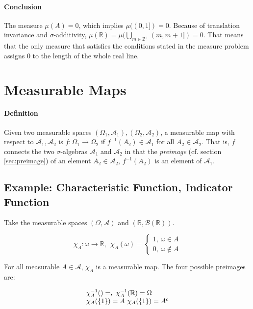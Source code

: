 \paragraph{Conclusion}
The measure $\mu(A) = 0$, which implies $\mu((0,1]) = 0$. Because of translation invariance and $\sigma$-additivity, $\mu(\mathbb{R}) = \mu(\bigcup_{m\in\mathbb{Z}^+} (m,m+1]) = 0$. That means that the only measure that satisfies the conditions stated in the measure problem assigns $0$ to the length of the whole real line. 


  
\section{Measurable Maps}
\paragraph{Definition} Given two measurable spaces $(\Omega_1,\mathscr{A}_1), (\Omega_2, \mathscr{A}_2)$, a measurable map with respect to $\mathscr{A}_1, \mathscr{A}_2$ is $f:\Omega_1 \rightarrow \Omega_2$ if $f^{-1}(A_2)\in\mathscr{A}_1$ for all $A_2 \in \mathscr{A}_2$. That is, $f$ connects the two $\sigma$-algebras $\mathscr{A}_1$ and $\mathscr{A}_2$ in that the \textit{preimage} (cf. section \ref{sec:preimage}) of an element $A_2 \in \mathscr{A}_2$, $f^{-1}(A_2)$ is an element of $\mathscr{A}_1$. 




\subsection{Example: Characteristic Function, Indicator Function}
Take the measurable spaces $(\Omega,\mathscr{A})$ and $(\mathbb{R},\mathscr{B}(\mathbb{R}))$. 

\begin{equation}
\chi_A: \omega \rightarrow \mathbb{R},\ \ \chi_A(\omega) = \left\{\begin{array}{l} 1,\ \omega\in A\\ 0,\ \omega\notin A \end{array}\right.
\end{equation}

For all measurable $A\in\mathscr{A}$, $\chi_A$ is a measurable map. The four possible preimages are:

\begin{equation}
\begin{array}{l}
\chi_A^{-1}(\empty) = \empty,\ \chi_A^{-1}(\mathbb{R}) = \Omega\\
\chi_A(\{ 1 \}) = A\ \chi_A(\{ 1 \}) = A^c
\end{array}
\end{equation}

